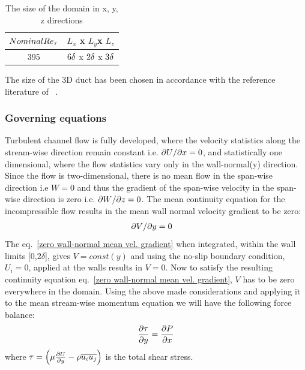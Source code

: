 \begin{table}[!h]
\centering
\begin{tabular}{c|c}
\hline
$Nominal Re_{\tau}$ & $L_x$ x $L_y $x $L_z$ \\
\hline
%
395   &  $6\delta$ x $2\delta$ x $3\delta$  \\
\hline
\end{tabular}
\caption{The size of the domain in x, y, z directions}
\label{Computational Domain}
\end{table}

The size of the 3D duct has been chosen in accordance with the reference literature of ~\cite{moser:kim:mansour:99}.

\subsubsection{Governing equations}

Turbulent channel flow is fully developed, where the velocity statistics along the stream-wise direction remain constant i.e. ${\partial U}/{\partial x}=0 $, and statistically one dimensional, where the flow statistics vary only in the wall-normal(y) direction. Since the flow is two-dimensional, there is no mean flow in the span-wise direction i.e $W=0$ and thus the gradient of the span-wise velocity in the span-wise direction is zero i.e. ${\partial W}/{\partial z}=0 $. The mean continuity equation for the incompressible flow results in the mean wall normal velocity gradient to be zero:
\begin{equation}
\label{zero wall-normal mean vel. gradient}
\begin{split}
{\partial V}/{\partial y}&=0
\end{split}
\end{equation}
The eq.~\ref{zero wall-normal mean vel. gradient} when integrated, within the wall limits [0,$2\delta$], gives $V=const(y)$ and using the no-slip boundary condition, $U_i = 0$, applied at the walls results in $V = 0$. Now to satisfy the resulting continuity equation eq.~\ref{zero wall-normal mean vel. gradient}, $V$ has to be zero everywhere in the domain. Using the above made considerations and applying it to the mean stream-wise momentum equation we will have the following force balance:
\begin{equation}
\label{Forces channel flow}
\frac{\partial \tau}{\partial y} = \frac{\partial P}{\partial x}\\
\end{equation}
where $\tau = \left(\mu \frac{\partial U}{\partial y} - \rho\overline{u_iu_j}\right)$ is the total shear stress.\\

